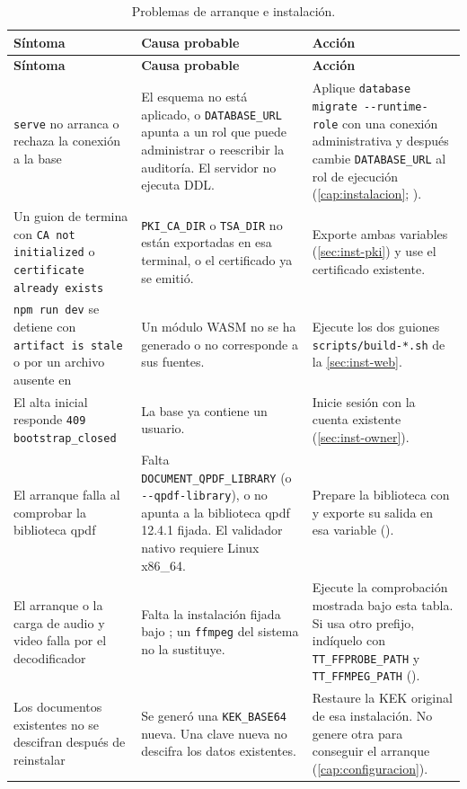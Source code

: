 {\small
\begin{longtable}{L{3.7cm} L{4.6cm} L{7.1cm}}
  \caption{Problemas de arranque e instalación.}\label{tab:prob-arranque} \\
  \toprule
  \textbf{Síntoma} & \textbf{Causa probable} & \textbf{Acción} \\
  \midrule
  \endfirsthead
  \toprule
  \textbf{Síntoma} & \textbf{Causa probable} & \textbf{Acción} \\
  \midrule
  \endhead
  \bottomrule
  \endfoot
    \texttt{serve} no arranca o rechaza la conexión a la base
      & El esquema no está aplicado, o \texttt{DATABASE\_URL} apunta a un rol
        que puede administrar o reescribir la auditoría. El servidor no
        ejecuta DDL.
      & Aplique \texttt{database migrate -{}-runtime-role} con una conexión
        administrativa y después cambie \texttt{DATABASE\_URL} al rol
        de ejecución (\cref{cap:instalacion};
        ). \\
    Un guion de  termina con \texttt{CA not initialized} o
    \texttt{certificate already exists}
      & \texttt{PKI\_CA\_DIR} o \texttt{TSA\_DIR} no están exportadas en
        esa terminal, o el certificado ya se emitió.
      & Exporte ambas variables (\cref{sec:inst-pki}) y use el certificado
        existente. \\
    \texttt{npm run dev} se detiene con \texttt{artifact is stale} o
    por un archivo ausente en 
      & Un módulo WASM no se ha generado o no corresponde a sus fuentes.
      & Ejecute los dos guiones \texttt{scripts/build-*.sh} de la
        \cref{sec:inst-web}. \\
    El alta inicial responde \texttt{409 bootstrap\_closed}
      & La base ya contiene un usuario.
      & Inicie sesión con la cuenta existente (\cref{sec:inst-owner}). \\
    El arranque falla al comprobar la biblioteca qpdf
      & Falta \texttt{DOCUMENT\_QPDF\_LIBRARY} (o \texttt{-{}-qpdf-library}),
        o no apunta a la biblioteca qpdf 12.4.1 fijada. El validador nativo
        requiere Linux x86\_64.
      & Prepare la biblioteca con
         y exporte su salida en
        esa variable (). \\
    El arranque o la carga de audio y video falla por el decodificador
      & Falta la instalación fijada bajo ; un
        \texttt{ffmpeg} del sistema no la sustituye.
      & Ejecute la comprobación mostrada bajo esta tabla. Si usa otro prefijo,
        indíquelo con \texttt{TT\_FFPROBE\_PATH} y \texttt{TT\_FFMPEG\_PATH}
        (). \\
    Los documentos existentes no se descifran después de reinstalar
      & Se generó una \texttt{KEK\_BASE64} nueva. Una clave nueva no descifra
        los datos existentes.
      & Restaure la KEK original de esa instalación. No genere otra para
        conseguir el arranque (\cref{cap:configuracion}). \\
\end{longtable}}

